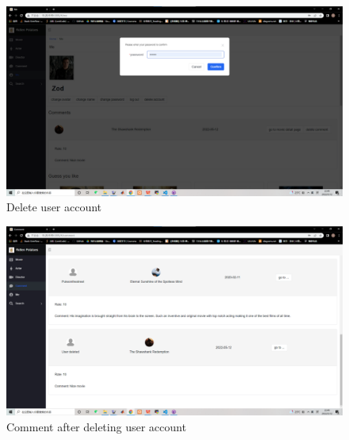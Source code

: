 \begin{CJK*}{UTF8}{gbsn}
    \begin{figure}[htbp]
    \centering
    \includegraphics[width=1\textwidth]{res_delete1.png}
    \caption{Delete user account}
    \end{figure}
    
    \begin{figure}[htbp]
    \centering
    \includegraphics[width=1\textwidth]{res_delete2.png}
    \caption{Comment after deleting user account}
    \end{figure}
\end{CJK*}

